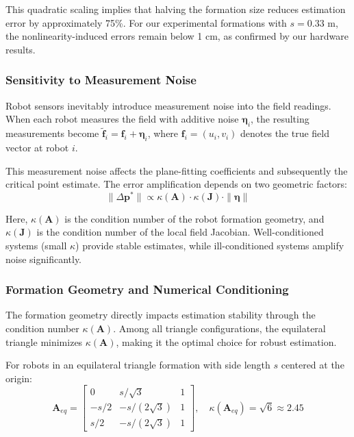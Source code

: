 \documentclass[lettersize,journal]{IEEEtran}
\begin{document}
This quadratic scaling implies that halving the formation size reduces estimation error by approximately 75\%. For our experimental formations with $s = 0.33$ m, the nonlinearity-induced errors remain below 1 cm, as confirmed by our hardware results.

\subsubsection{Sensitivity to Measurement Noise}

Robot sensors inevitably introduce measurement noise into the field readings. When each robot measures the field with additive noise $\boldsymbol{\eta}_i$, the resulting measurements become $\tilde{\mathbf{f}}_i = \mathbf{f}_i + \boldsymbol{\eta}_i$, where $\mathbf{f}_i = (u_i, v_i)$ denotes the true field vector at robot $i$.

This measurement noise affects the plane-fitting coefficients and subsequently the critical point estimate. The error amplification depends on two geometric factors:
\begin{equation}
\|\Delta\mathbf{p}^*\| \propto \kappa(\mathbf{A}) \cdot \kappa(\mathbf{J}) \cdot \|\boldsymbol{\eta}\|
\end{equation}

Here, $\kappa(\mathbf{A})$ is the condition number of the robot formation geometry, and $\kappa(\mathbf{J})$ is the condition number of the local field Jacobian. Well-conditioned systems (small $\kappa$) provide stable estimates, while ill-conditioned systems amplify noise significantly.

\subsubsection{Formation Geometry and Numerical Conditioning}

The formation geometry directly impacts estimation stability through the condition number $\kappa(\mathbf{A})$. Among all triangle configurations, the equilateral triangle minimizes $\kappa(\mathbf{A})$, making it the optimal choice for robust estimation.

For robots in an equilateral triangle formation with side length $s$ centered at the origin:
\begin{equation}
\mathbf{A}_{eq} = \begin{bmatrix}
0 & s/\sqrt{3} & 1 \\
-s/2 & -s/(2\sqrt{3}) & 1 \\
s/2 & -s/(2\sqrt{3}) & 1
\end{bmatrix}, \quad \kappa(\mathbf{A}_{eq}) = \sqrt{6} \approx 2.45
\end{equation}
\end{document}
